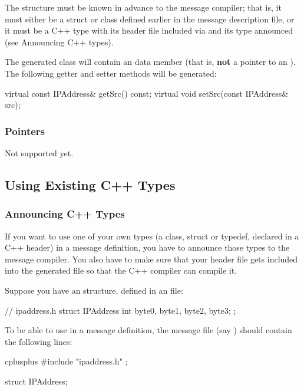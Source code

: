 The  structure must be known in advance to the message compiler;
that is, it must either be a struct or class defined earlier in the message
description file, or it must be a C++ type with its header file
included via  and its type announced
(see Announcing C++ types).

The generated class will contain an  data member
(that is, \textbf{not} a pointer to an ).
The following getter and setter methods will be generated:

\begin{cpp}
virtual const IPAddress& getSrc() const;
virtual void setSrc(const IPAddress& src);
\end{cpp}


\subsubsection{Pointers}

Not supported yet.



\subsection{Using Existing C++ Types}


\subsubsection{Announcing C++ Types}

If you want to use one of your own types (a class, struct or typedef,
declared in a C++ header) in a message definition, you have to
announce those types to the message compiler. You also have to make sure
that your header file gets included into the generated  file
so that the C++ compiler can compile it.

Suppose you have an  structure, defined in an 
file:

\begin{cpp}
// ipaddress.h
struct IPAddress {
    int byte0, byte1, byte2, byte3;
};
\end{cpp}

To be able to use  in a message definition, the message
file (say ) should contain the following lines:

\begin{msg}
cplusplus {{
#include "ipaddress.h"
}};

struct IPAddress;
\end{msg}

